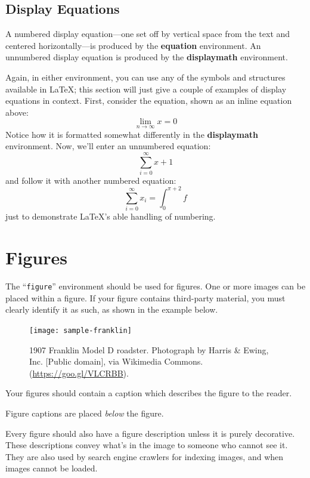 \documentclass[sigconf,nonacm=true]{acmart}
\begin{document}
\subsection{Display Equations}
A numbered display equation---one set off by vertical space from the
text and centered horizontally---is produced by the \textbf{equation}
environment. An unnumbered display equation is produced by the
\textbf{displaymath} environment.

Again, in either environment, you can use any of the symbols and
structures available in \LaTeX\@; this section will just give a couple
of examples of display equations in context.  First, consider the
equation, shown as an inline equation above:
\begin{equation}
  \lim_{n\rightarrow \infty}x=0
\end{equation}
Notice how it is formatted somewhat differently in
the \textbf{displaymath}
environment.  Now, we'll enter an unnumbered equation:
\begin{displaymath}
  \sum_{i=0}^{\infty} x + 1
\end{displaymath}
and follow it with another numbered equation:
\begin{equation}
  \sum_{i=0}^{\infty}x_i=\int_{0}^{\pi+2} f
\end{equation}
just to demonstrate \LaTeX's able handling of numbering.

\section{Figures}

The ``\verb|figure|'' environment should be used for figures. One or
more images can be placed within a figure. If your figure contains
third-party material, you must clearly identify it as such, as shown
in the example below.
\begin{figure}[h]
  \centering
  \texttt{[image: sample-franklin]}
  \caption{1907 Franklin Model D roadster. Photograph by Harris \&
    Ewing, Inc. [Public domain], via Wikimedia
    Commons. (\url{https://goo.gl/VLCRBB}).}
\end{figure}

Your figures should contain a caption which describes the figure to
the reader.

Figure captions are placed {\itshape below} the figure.

Every figure should also have a figure description unless it is purely
decorative. These descriptions convey what’s in the image to someone
who cannot see it. They are also used by search engine crawlers for
indexing images, and when images cannot be loaded.
\end{document}
